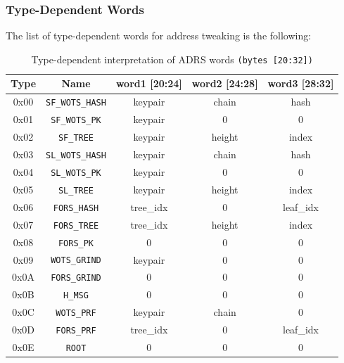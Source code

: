\subsubsection{Type-Dependent Words}
The list of type-dependent words for address tweaking is the following:
\begin{table}[h!]
\centering
\begin{tabular}{c c c c c}
\hline
\textbf{Type} & \textbf{Name} & \textbf{word1 [20:24]} & \textbf{word2 [24:28]} & \textbf{word3 [28:32]} \\
\hline
0x00 & \texttt{SF\_WOTS\_HASH}  & keypair   & chain   & hash \\
0x01 & \texttt{SF\_WOTS\_PK}    & keypair   & 0       & 0 \\
0x02 & \texttt{SF\_TREE}        & keypair   & height  & index \\
0x03 & \texttt{SL\_WOTS\_HASH}  & keypair   & chain   & hash \\
0x04 & \texttt{SL\_WOTS\_PK}    & keypair   & 0       & 0 \\
0x05 & \texttt{SL\_TREE}        & keypair   & height  & index \\
0x06 & \texttt{FORS\_HASH}      & tree\_idx & 0       & leaf\_idx \\
0x07 & \texttt{FORS\_TREE}      & tree\_idx & height  & index \\
0x08 & \texttt{FORS\_PK}        & 0         & 0       & 0 \\
0x09 & \texttt{WOTS\_GRIND}     & keypair   & 0       & 0 \\
0x0A & \texttt{FORS\_GRIND}     & 0         & 0       & 0 \\
0x0B & \texttt{H\_MSG}          & 0         & 0       & 0 \\
0x0C & \texttt{WOTS\_PRF}       & keypair   & chain   & 0 \\
0x0D & \texttt{FORS\_PRF}       & tree\_idx & 0       & leaf\_idx \\
0x0E & \texttt{ROOT}            & 0         & 0       & 0 \\
\hline
\end{tabular}
\caption{Type-dependent interpretation of ADRS words \texttt{(bytes [20:32])}}
\end{table}